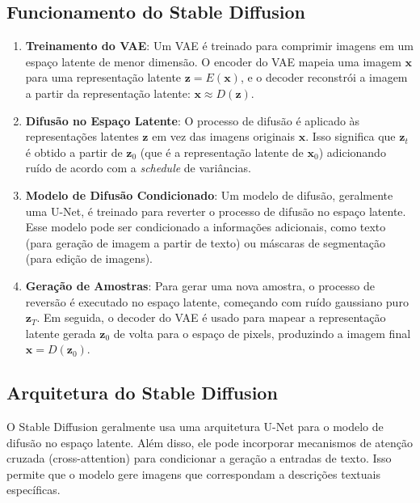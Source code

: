\documentclass{tufte-handout}
\let\subsubsection\subsection
\begin{document}
\subsubsection{Funcionamento do Stable Diffusion}

\begin{enumerate}
    \item \textbf{Treinamento do VAE}: Um VAE é treinado para comprimir imagens em um espaço latente de menor dimensão. O encoder do VAE mapeia uma imagem $\mathbf{x}$ para uma representação latente $\mathbf{z} = E(\mathbf{x})$, e o decoder reconstrói a imagem a partir da representação latente: $\mathbf{x} \approx D(\mathbf{z})$.
    \item \textbf{Difusão no Espaço Latente}: O processo de difusão é aplicado às representações latentes $\mathbf{z}$ em vez das imagens originais $\mathbf{x}$. Isso significa que $\mathbf{z}_t$ é obtido a partir de $\mathbf{z}_0$ (que é a representação latente de $\mathbf{x}_0$) adicionando ruído de acordo com a \textit{schedule} de variâncias.
    \item \textbf{Modelo de Difusão Condicionado}: Um modelo de difusão, geralmente uma U-Net, é treinado para reverter o processo de difusão no espaço latente. Esse modelo pode ser condicionado a informações adicionais, como texto (para geração de imagem a partir de texto) ou máscaras de segmentação (para edição de imagens).
    \item \textbf{Geração de Amostras}: Para gerar uma nova amostra, o processo de reversão é executado no espaço latente, começando com ruído gaussiano puro $\mathbf{z}_T$. Em seguida, o decoder do VAE é usado para mapear a representação latente gerada $\mathbf{z}_0$ de volta para o espaço de pixels, produzindo a imagem final $\mathbf{x} = D(\mathbf{z}_0)$.
\end{enumerate}

\subsubsection{Arquitetura do Stable Diffusion}

O Stable Diffusion geralmente usa uma arquitetura U-Net para o modelo de difusão no espaço latente. Além disso, ele pode incorporar mecanismos de atenção cruzada (cross-attention) para condicionar a geração a entradas de texto. Isso permite que o modelo gere imagens que correspondam a descrições textuais específicas.
\end{document}
